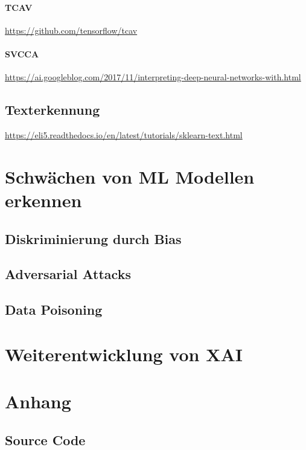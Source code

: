 \documentclass[
  12pt, %
  a4paper, %
  oneside, %
  openany, 
  numbers=noenddot, %
  BCOR=5mm, %
  parskip=half*, %
  thesis, %
]{bfhbook}
\begin{document}
\subsubsection*{TCAV}
\url{https://github.com/tensorflow/tcav}

\subsubsection*{SVCCA}
\url{https://ai.googleblog.com/2017/11/interpreting-deep-neural-networks-with.html}

\section{Texterkennung}
\url{https://eli5.readthedocs.io/en/latest/tutorials/sklearn-text.html}

\chapter{Schwächen von ML Modellen erkennen}
\section{Diskriminierung durch Bias}
\section{Adversarial Attacks}
\section{Data Poisoning}

\chapter{Weiterentwicklung von XAI}

\chapter{Anhang}
\section{Source Code}
\label{dt-vis}
\end{document}
